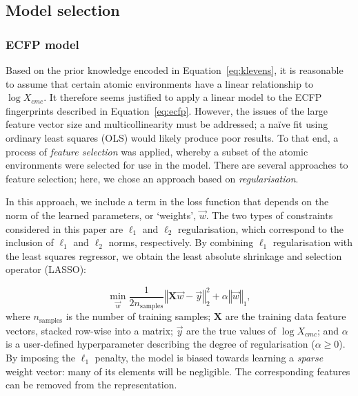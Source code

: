 \subsection{Model selection}

\subsubsection{ECFP model}

Based on the prior knowledge encoded in Equation~\ref{eq:klevens}, it is
reasonable to assume that certain atomic environments have a linear relationship
to $\log X_{cmc}$. It therefore seems justified to apply a linear model to the
ECFP fingerprints described in Equation~\ref{eq:ecfp}. However, the issues of
the large feature vector size and multicollinearity must be addressed; a na\"ive
fit using ordinary least squares (OLS) would likely produce poor results. To
that end, a process of \emph{feature selection} was applied, whereby a subset of
the atomic environments were selected for use in the model. There are several
approaches to feature selection\cite{liFeatureSelectionData2017}; here, we chose
an approach based on \emph{regularisation}.

In this approach, we include a term in the loss function that depends on the
norm of the learned parameters, or `weights', $\vec{w}$. The two types of constraints
considered in this paper are $\ell_1$ and $\ell_2$ regularisation, which correspond to
the inclusion of $\ell_1$ and $\ell_2$ norms, respectively. By combining $\ell_1$
regularisation with the least squares regressor, we obtain the least absolute
shrinkage and selection operator (LASSO)\cite{tibshiraniRegressionShrinkageSelection1996}:

\begin{equation}
    \min_{\vec{w}} { \frac{1}{2n_{\text{samples}}} \left \Vert \mathbf{X}\vec{w} - \vec{y} \right \Vert_2 ^ 2 + \alpha \left \Vert \vec{w} \right \Vert_1},
\end{equation}
where $n_{\text{samples}}$ is the number of training samples; $\mathbf{X}$ are
the training data feature vectors, stacked row-wise into a matrix; $\vec{y}$ are
the true values of $\log X_{cmc}$; and $\alpha$ is a user-defined hyperparameter
describing the degree of regularisation ($\alpha \geq 0$). By imposing the $\ell_1$ penalty, the
model is biased towards learning a \emph{sparse} weight vector: many of its
elements will be negligible. The corresponding features can be removed from the
representation.

